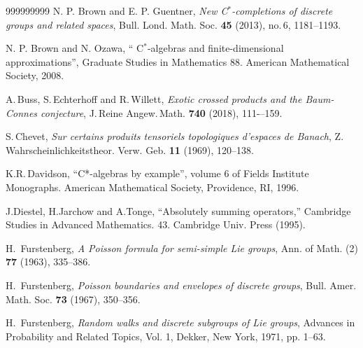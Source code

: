 \documentclass[12pt]{amsart}
\theoremstyle{definition}
\theoremstyle{remark}
\numberwithin{equation}{section}
\begin{document}
\begin{thebibliography}{999999999}
 N. P. Brown and E. P. Guentner, {\it New C$^*$-completions of discrete groups and related spaces}, Bull. Lond. Math. Soc. \textbf{45} (2013), no.\,6, 1181--1193.

 N. P. Brown and N. Ozawa, `` C$^*$-algebras and finite-dimensional approximations'', Graduate Studies in Mathematics 88.  American Mathematical Society, 2008.


  A.\,Buss, S.\,Echterhoff and R.\,Willett, {\it Exotic crossed products and the Baum-Connes conjecture}, J.\,Reine Angew.\,Math. \textbf{740} (2018), 111-–159.




  S.\,Chevet,
{\it Sur certains produits tensoriels topologiques d’espaces de Banach},
Z. Wahrscheinlichkeitstheor. Verw. Geb. \textbf{11} (1969), 120--138.




  K.R.\,Davidson, ``C*-algebras by example'', volume 6 of Fields Institute Monographs.
American Mathematical Society, Providence, RI, 1996.

  J.Diestel, H.Jarchow and A.Tonge, ``Absolutely summing operators,''
Cambridge Studies in Advanced Mathematics. 43. Cambridge Univ. Press (1995).



 H.~Furstenberg, \emph{A Poisson formula for semi-simple Lie groups}, Ann. of Math. (2) \textbf{77} (1963), 335--386.


 H.~Furstenberg, \emph{Poisson boundaries and envelopes of discrete groups}, Bull. Amer. Math. Soc. \textbf{73} (1967), 350--356. 

 H.~Furstenberg, \emph{Random walks and discrete subgroups of Lie groups}, Advances in Probability and Related Topics, Vol. 1, Dekker, New York, 1971, pp. 1–63. 
 

\end{thebibliography}
\end{document}
